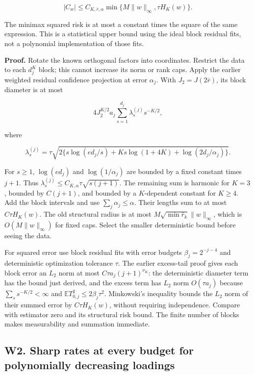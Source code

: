 \[|C_w|\le C_{K,\bar r,\alpha}
\min\{M\|w\|_\infty,\tau H_K(w)\}.\]

The minimax squared risk is at most a constant times the square of the
same expression. This is a statistical upper bound using the ideal block
residual fits, not a polynomial implementation of those fits.

\textbf{Proof.} Rotate the known orthogonal factors into coordinates.
Restrict the data to each \(d_j^K\) block; this cannot increase its norm
or rank caps. Apply the earlier weighted residual confidence projection
at error \(\alpha_j\). With \(J_2=J(2\bar r)\), its block diameter is at
most

\[4J_2^{K/2}a_j\sum_{s=1}^{d_j}\lambda_s^{(j)}s^{-K/2},\]

where

\[\lambda_s^{(j)}=\tau\sqrt{2\{s\log(ed_j/s)+Ks\log(1+4K)
+\log(2d_j/\alpha_j)\}}.\]

For \(s\ge1\), \(\log(ed_j)\) and \(\log(1/\alpha_j)\) are bounded by a
fixed constant times \(j+1\). Thus
\(\lambda_s^{(j)}\le C_{K,\alpha}\tau\sqrt{s(j+1)}\). The remaining sum
is harmonic for \(K=3\), bounded by \(C(j+1)\), and bounded by a
\(K\)-dependent constant for \(K\ge4\). Add the block intervals and use
\(\sum_j\alpha_j\le\alpha\). Their lengths sum to at most
\(C\tau H_K(w)\). The old structural radius is at most
\(M\sqrt{\min\bar r_k}\|w\|_\infty\), which is \(O(M\|w\|_\infty)\) for
fixed caps. Select the smaller deterministic bound before seeing the
data.

For squared error use block residual fits with error budgets
\(\beta_j=2^{-j-4}\) and deterministic optimization tolerance \(\tau\).
The earlier excess-tail proof gives each block error an \(L_2\) norm at
most \(C\tau a_j(j+1)^{\nu_K}\): the deterministic diameter term has the
bound just derived, and the excess term has \(L_2\) norm \(O(\tau a_j)\)
because \(\sum_s s^{-K/2}<\infty\) and
\(\mathbb E T_{0,j}^2\le2\beta_j\tau^2\). Minkowski's inequality bounds
the \(L_2\) norm of their summed error by \(C\tau H_K(w)\), without
requiring independence. Compare with estimator zero and its structural
risk bound. The finite number of blocks makes measurability and
summation immediate.

\subsection{W2. Sharp rates at every budget for polynomially decreasing
loadings}\label{w2.-sharp-rates-at-every-budget-for-polynomially-decreasing-loadings}\label{sup:W2}

